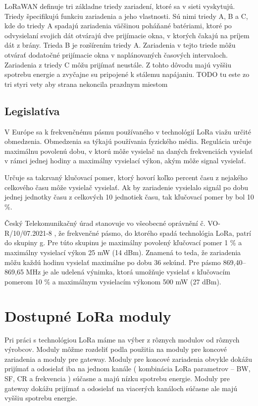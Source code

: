 \documentclass[slovak,master]{diploma}
\begin{document}
LoRaWAN definuje tri základne triedy zariadení, ktoré sa v sieti vyskytujú. Triedy špecifikujú funkciu zariadenia a jeho vlastnosti.
Sú nimi triedy A, B a C, kde do triedy A spadajú zariadenia väčšinou poháňané batériami, ktoré po odvysielaní svojich dát otvárajú dve prijímacie okna, 
v ktorých čakajú na príjem dát z brány.
Trieda B je rozšírením triedy A. Zariadenia v tejto triede môžu otvárať dodatočné prijímacie okna v naplánovaných časových intervaloch.
Zariadenia z triedy C môžu prijímať neustále. Z tohto dôvodu majú vyššiu spotrebu energie a zvyčajne su pripojené k stálemu napájaniu.
TODO tu este zo tri styri  vety aby strana nekoncila prazdnym miestom

\section{Legislatíva}
V Európe sa k frekvenčnému pásmu používaného v technológií LoRa viažu určité obmedzenia. 
Obmedzenia sa týkajú používania fyzického média. Regulácia určuje maximálnu povolenú dobu, v ktorú môže vysielač na daných frekvenciách vysielať 
v rámci jednej hodiny a maximálny vysielací výkon, akým môže signal vysielať.

Určuje sa takzvaný klučovací pomer, ktorý hovorí koľko percent času z nejakého celkového času môže vysielač vysielať.
Ak by zariadenie vysielalo signál po dobu jednej jednotky času z celkových 10 jednotiek času, tak kľučovací pomer by bol 10 \%.

Český Telekomunikačný úrad \cite{ctu} stanovuje vo všeobecné oprávnění č. VO-R/10/07.2021-8 \cite{vor}, že 
frekvenčné pásmo, do ktorého spadá technológia LoRa, patrí do skupiny g. Pre túto skupinu je maximálny povolený kľučovací pomer 1 \% a maximálny 
vysielací výkon 25 mW (14 dBm). Znamená to teda, že zariadenia môžu každú hodinu vysielať maximálne po dobu 36 sekúnd.
Pre pásmo 869,40--869,65 MHz je ale udelená výnimka, ktorá umožňuje vysielať s kľučovacím pomerom 10 \% a maximálnym vysielacím výkonom 500 mW (27 dBm).

\chapter{Dostupné LoRa moduly }
Pri práci s technológiou LoRa máme na výber z rôznych modulov od rôznych výrobcov.
Moduly môžme rozdeliť podla použitia na moduly pre koncové zariadenia a moduly pre gateway.
Moduly pre koncové zariadenia obvykle dokážu prijímať a odosielať iba na jednom kanále ( kombinácia LoRa parametrov --  BW, SF, CR a frekvencia ) súčasne a majú 
nízku spotrebu energie. Moduly pre gateway dokážu prijímať a odosielať na viacerých kanáloch súčasne ale majú vyššiu spotrebu energie.
\end{document}
